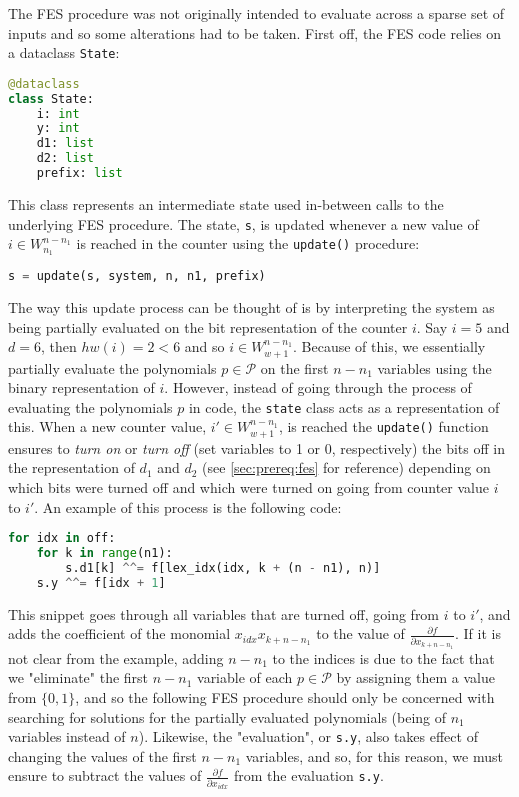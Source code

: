 The FES procedure was not originally intended to evaluate across a sparse set of inputs and so some alterations had to be taken. First off, the FES code relies on a dataclass \texttt{State}:
\begin{lstlisting}[language=Python,style=mystyle]
@dataclass
class State:
    i: int
    y: int
    d1: list
    d2: list
    prefix: list
\end{lstlisting}
This class represents an intermediate state used in-between calls to the underlying FES procedure. The state, \texttt{s}, is updated whenever a new value of $i \in W^{n - n_1}_{n_1}$ is reached in the counter using the \texttt{update()} procedure:
\begin{lstlisting}[language=Python,style=mystyle]
s = update(s, system, n, n1, prefix)
\end{lstlisting}
The way this update process can be thought of is by interpreting the system as being partially evaluated on the bit representation of the counter $i$. Say $i = 5$ and $d = 6$, then $hw(i) = 2 < 6$ and so $i \in W^{n - n_1}_{w + 1}$. Because of this, we essentially partially evaluate the polynomials $p \in \mathcal{P}$ on the first $n - n_1$ variables using the binary representation of $i$. However, instead of going through the process of evaluating the polynomials $p$ in code, the \texttt{state} class acts as a representation of this. When a new counter value, $i' \in W^{n - n_1}_{w + 1}$, is reached the \texttt{update()} function ensures to \textit{turn on} or \textit{turn off} (set variables to 1 or 0, respectively) the bits off in the representation of $d_1$ and $d_2$ (see \cref{sec:prereq:fes} for reference) depending on which bits were turned off and which were turned on going from counter value $i$ to $i'$. An example of this process is the following code:
\begin{lstlisting}[language=Python,style=mystyle]
for idx in off:
    for k in range(n1):
        s.d1[k] ^^= f[lex_idx(idx, k + (n - n1), n)] 
    s.y ^^= f[idx + 1]
\end{lstlisting}
This snippet goes through all variables that are turned off, going from $i$ to $i'$, and adds the coefficient of the monomial $x_{idx}x_{k + n - n_1}$ to the value of $\frac{\partial f}{\partial x_{k + n - n_1}}$. If it is not clear from the example, adding $n - n_1$ to the indices is due to the fact that we "eliminate" the first $n - n_1$ variable of each $p \in \mathcal{P}$ by assigning them a value from $\{0,1\}$, and so the following FES procedure should only be concerned with searching for solutions for the partially evaluated polynomials (being of $n_1$ variables instead of $n$). Likewise, the "evaluation", or \texttt{s.y}, also takes effect of changing the values of the first $n - n_1$ variables, and so, for this reason, we must ensure to subtract the values of $\frac{\partial f}{\partial x_{idx}}$ from the evaluation \texttt{s.y}.

